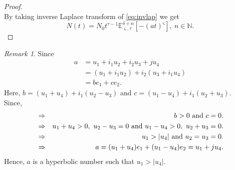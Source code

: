 \documentclass[a4paper,12pt]{article}
\theoremstyle{remark}
\newtheorem{remark}[theorem]{Remark}
\begin{document}
\begin{proof}
\begin{equation}
\end{equation}
By taking inverse Laplace transform of \eqref{eq:invlap} we get
\begin{equation}\label{eq:app1}
	N(t) = N_0t^{\tau -1}\mathbb{E}_{ \varsigma,\tau}^{\delta+n}[-(a t)^{ \varsigma}],~n\in \mathbb{N}.
	\end{equation}


\end{proof}
    

\begin{remark}
Since
\begin{equation}\label{eq: an}
\begin{split}
a&=u_{1} +i_1u_{2}+i_2u_{3}+j u_{4}\\
&=(u_{1} +i_1u_{2})+i_2(u_{3}+i_1u_{4})\\
&=b e_1+c e_2.
\end{split}
\end{equation}
Here,  $b= (u_{1}+u_{4}) +i_1(u_{2}-u_{3})$ and $c= (u_{1}-u_{4}) +i_1(u_{2}+u_{3}).$\\
Since,
\begin{eqnarray}
&\Rightarrow&b>0 \text{ and} ~ c=0.\notag \\
&\Rightarrow& u_{1}+u_{4}>0, ~u_{2}-u_{3}=0~\text{and}~ u_{1}-u_{4}>0 ,~u_{2}+u_{3}=0. \notag \\
&	\Rightarrow& u_{1}> |u_{4}|~\text{and}~ u_{2}=u_{3}=0.\\
&	\Rightarrow &	a=(u_{1} +u_{4})e_1+(u_{1} -u_{4})e_2=u_{1} +ju_{4}.\label{eq :an equi1}	
\end{eqnarray}	
Hence, $a $ is a hyperbolic number such that $u_{1}> |u_{4}|.$ \\
\end{remark}
\end{document}
